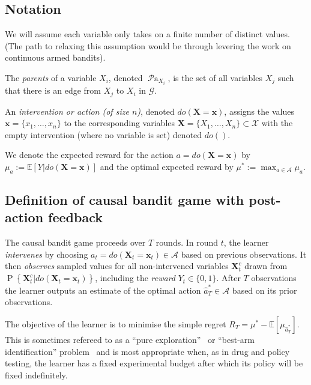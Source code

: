 \documentclass[11pt,a4paper,oneside]{book}
\newcommand{\simpleregret}{R_T}
\newcommand{\actions}{\mathcal{A}}
\newcommand{\E}[1]{\mathbb E\left[{#1}\right]}
\renewcommand{\P}[1]{\operatorname{P}\left\{#1\right\}}
\newcommand{\parents}[1]{\operatorname{\mathcal{P}a}_{#1}}
\renewcommand{\vec}[1]{\boldsymbol{#1}}
\theoremstyle{plain}
\theoremstyle{definition}
\begin{document}
\subsection{Notation}

We will assume each variable only takes on a finite number of distinct values. (The path to relaxing this assumption would be through levering the work on continuous armed bandits). 

The \emph{parents} of a variable $X_i$, denoted $\parents{X_i}$, is the set of all variables $X_j$ such that there is an edge from $X_j$ to $X_i$ in $\mathcal{G}$.

An \emph{intervention or action (of size $n$)}, denoted $do(\vec{X}=\vec{x})$, assigns the values $\vec{x}=\{x_1, \ldots, x_n\}$ to the corresponding variables $\vec{X}=\{X_1, \ldots, X_n\} \subset \mathcal{X}$ with the empty intervention (where no variable is set) denoted $do()$.


We denote the expected reward for the action $a = do(\vec{X} = \vec{x})$ by $\mu_{a} := \E{Y | do(\vec{X} = \vec{x})}$ and 
the optimal expected reward by $\mu^* := \max_{a\in\actions} \mu_{a}$. 


\subsection{Definition of causal bandit game with post-action feedback}

The causal bandit game proceeds over $T$ rounds.
In round $t$, the learner \emph{intervenes} by choosing $a_t = do(\vec{X}_t = \vec{x}_t) \in \mathcal{A}$ based on previous observations. 
It then \emph{observes} sampled values for all non-intervened variables $\vec{X}^c_t$ drawn from $\P{\vec{X}^c_t | do(\vec{X}_t = \vec{x}_t)}$, 
including the \emph{reward} $Y_t \in \{0,1\}$. 
After $T$ observations the learner outputs an estimate of the optimal action $\hat a^*_T \in \actions$ based on its prior observations.

The objective of the learner is to minimise the simple regret $\simpleregret = \mu^* - \E{\mu_{\hat a^*_T}}.$ This is sometimes refereed to as a ``pure exploration''~\citep{Bubeck2009a} or ``best-arm identification'' problem~\citep{Gabillon2012a} and is most appropriate when, as in drug and policy testing, the learner has a fixed experimental budget after which its policy will be fixed indefinitely. 
\end{document}
